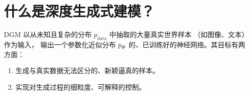 


\newpage
\section{什么是深度生成式建模？}\label{sec:formulation-dgm}




DGM 以从未知且复杂的分布 $p_{\mathrm{data}}$ 中抽取的大量真实世界样本
（如图像、文本）作为输入，
输出一个参数化近似分布 $p_{{\bm{\phi}}}$ 的、已训练好的神经网络。其目标有两方面：
\begin{enumerate}
\item {}生成与真实数据无法区分的、新颖逼真的样本。
\item {}实现对生成过程的细粒度、可解释的控制。
\end{enumerate}





